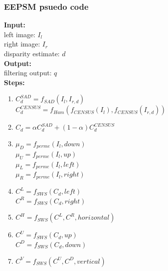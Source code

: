 \subsubsection*{EEPSM psuedo code} \label{sec:eepsmpsuedocode}
\textbf{Input:} \\
left image: $I_l$\\
right image: $I_r$\\
disparity estimate: $d$\\
\textbf{Output:} \\
filtering output: $q$\\
\textbf{Steps:}
\begin{enumerate}
  \item $C^{SAD}_d = f_{SAD}(I_l,I_{r,d})$\\
           $C^{CENSUS}_d = f_{Ham}(f_{CENSUS}(I_l),f_{CENSUS}(I_{r,d}))$
  \item $C_d = \alpha C^{SAD}_d + (1-\alpha) C^{CENSUS}_d$
  \item $\mu_D = f_{perme}(I_l,down)$ \\
           $\mu_U = f_{perme}(I_l,up)$ \\
           $\mu_L = f_{perme}(I_l,left)$ \\
           $\mu_R = f_{perme}(I_l,right)$
  \item $C^L = f_{SWS}(C_d,left)$\\
           $C^R = f_{SWS}(C_d,right)$
  \item $C^H = f_{SWS}(C^L,C^R,horizontal)$
  \item $C^U = f_{SWS}(C_d,up)$\\
           $C^D = f_{SWS}(C_d,down)$
  \item $C^V = f_{SWS}(C^U,C^D,vertical)$  
\end{enumerate}

